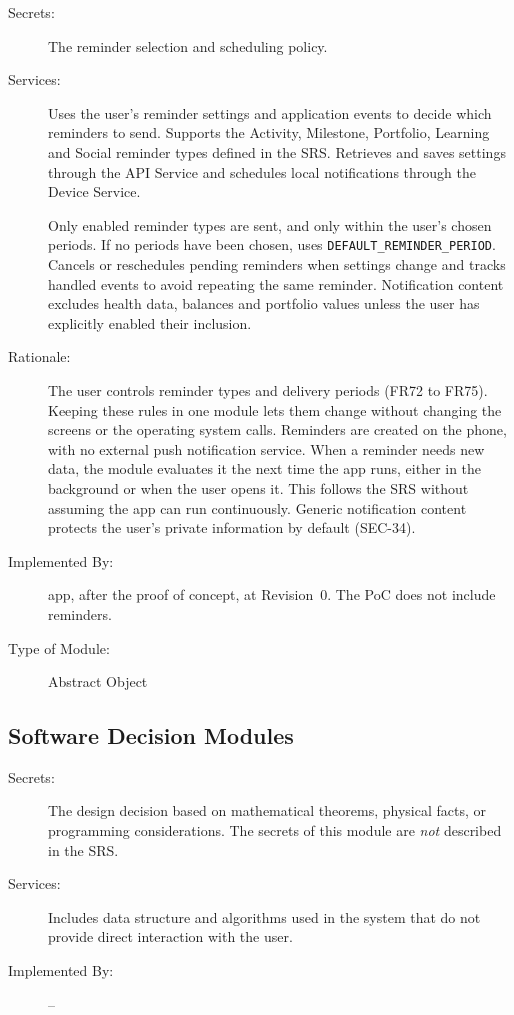 \documentclass[12pt, titlepage]{article}
\begin{document}
\begin{description}
\item[Secrets:] The reminder selection and scheduling policy.

\item[Services:] Uses the user's reminder settings and application events
to decide which reminders to send. Supports the Activity, Milestone,
Portfolio, Learning and Social reminder types defined in the SRS. Retrieves
and saves settings through the API Service and schedules local notifications
through the Device Service.

Only enabled reminder types are sent, and only within the user's chosen periods. If no periods have been chosen, uses \texttt{DEFAULT\_REMINDER\_PERIOD}. Cancels or reschedules pending reminders when settings change and tracks handled events to avoid repeating the same reminder. Notification content excludes health data, balances and portfolio values unless the user has explicitly enabled their inclusion.
\item[Rationale:] The user controls reminder types and delivery periods
(FR72 to FR75). Keeping these rules in one module lets them change without changing the screens or the operating system calls. Reminders are created on the phone, with no external push notification service. When a reminder needs new data, the module evaluates it the next time the app runs, either in the background or when the user opens it. This follows the SRS without assuming the app can run continuously. Generic notification content protects the user's private information by default (SEC-34).

\item[Implemented By:] \progname{} app, after the proof of concept,
at Revision~0. The PoC does not include reminders.

\item[Type of Module:] Abstract Object
\end{description}

\subsection{Software Decision Modules}

\begin{description}
\item[Secrets:] The design decision based on mathematical theorems, physical
  facts, or programming considerations. The secrets of this module are
  \emph{not} described in the SRS.
\item[Services:] Includes data structure and algorithms used in the system that
  do not provide direct interaction with the user.
\item[Implemented By:] --
\end{description}
\end{document}

